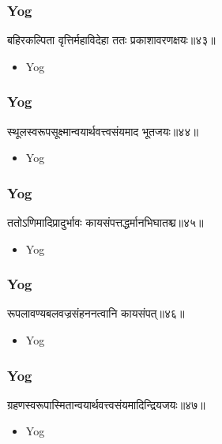 \begin{frame}[fragile]\frametitle{Yog}
\begin{sanskrit}
बहिरकल्पिता वृत्तिर्महाविदेहा ततः प्रकाशावरणक्षयः॥४३॥
\end{sanskrit}
	\begin{itemize}
	\item Yog 
	\end{itemize}
\end{frame}


\begin{frame}[fragile]\frametitle{Yog}
\begin{sanskrit}
स्थूलस्वरूपसूक्ष्मान्वयार्थवत्त्वसंयमाद भूतजयः॥४४॥
\end{sanskrit}
	\begin{itemize}
	\item Yog 
	\end{itemize}
\end{frame}

\begin{frame}[fragile]\frametitle{Yog}
\begin{sanskrit}
ततोऽणिमादिप्रादुर्भावः कायसंपत्तद्धर्मानभिघातश्च॥४५॥
\end{sanskrit}
	\begin{itemize}
	\item Yog 
	\end{itemize}
\end{frame}


\begin{frame}[fragile]\frametitle{Yog}
\begin{sanskrit}
रूपलावण्यबलवज्रसंहननत्वानि कायसंपत्॥४६॥
\end{sanskrit}
	\begin{itemize}
	\item Yog 
	\end{itemize}
\end{frame}



\begin{frame}[fragile]\frametitle{Yog}
\begin{sanskrit}
ग्रहणस्वरूपास्मितान्वयार्थवत्त्वसंयमादिन्द्रियजयः॥४७॥
\end{sanskrit}
	\begin{itemize}
	\item Yog 
	\end{itemize}
\end{frame}



